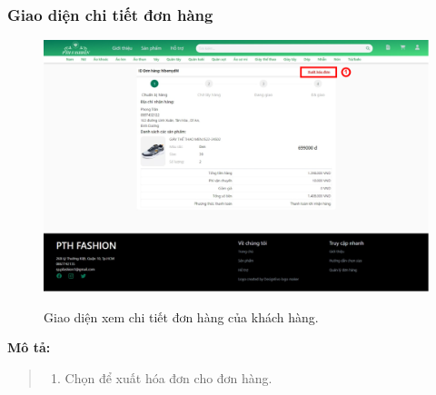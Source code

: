 \subsubsection{Giao diện chi tiết đơn hàng}
\begin{figure}[!htp]
    \centering
    \includegraphics[width=5in]{img/UI/new_customer/order_detail.png}
    \label{14}
    \newline
    \caption{Giao diện xem chi tiết đơn hàng của khách hàng.}
\end{figure}
\textbf{Mô tả:}
\begin{quote}
    \begin{enumerate}
        \item Chọn để xuất hóa đơn cho đơn hàng.
    \end{enumerate}
\end{quote}
\newpage

